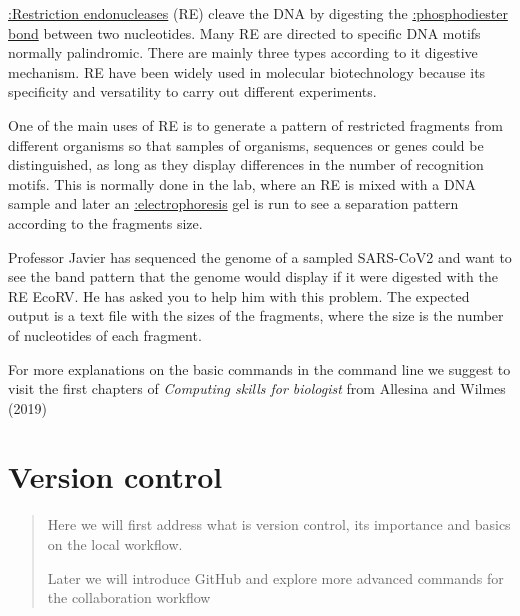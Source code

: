 \documentclass[
  letterpaper,
  DIV=11,
  numbers=noendperiod,
  oneside]{scrreprt}
\begin{document}
\begin{tcolorbox}[enhanced jigsaw, opacityback=0, leftrule=.75mm, breakable, titlerule=0mm, toprule=.15mm, rightrule=.15mm, title=\textcolor{quarto-callout-warning-color}{\faExclamationTriangle}\hspace{0.5em}{Challenge}, colback=white, opacitybacktitle=0.6, toptitle=1mm, bottomtitle=1mm, colframe=quarto-callout-warning-color-frame, colbacktitle=quarto-callout-warning-color!10!white, arc=.35mm, coltitle=black, bottomrule=.15mm, left=2mm]
\href{https://en.wikipedia.org/wiki/Restriction_enzyme}{:Restriction
endonucleases} (RE) cleave the DNA by digesting the
\href{https://en.wikipedia.org/wiki/Phosphodiester_bond}{:phosphodiester
bond} between two nucleotides. Many RE are directed to specific DNA
motifs normally palindromic. There are mainly three types according to
it digestive mechanism. RE have been widely used in molecular
biotechnology because its specificity and versatility to carry out
different experiments.

One of the main uses of RE is to generate a pattern of restricted
fragments from different organisms so that samples of organisms,
sequences or genes could be distinguished, as long as they display
differences in the number of recognition motifs. This is normally done
in the lab, where an RE is mixed with a DNA sample and later an
\href{https://en.wikipedia.org/wiki/Electrophoresis}{:electrophoresis}
gel is run to see a separation pattern according to the fragments size.

Professor Javier has sequenced the genome of a sampled SARS-CoV2 and
want to see the band pattern that the genome would display if it were
digested with the RE EcoRV. He has asked you to help him with this
problem. The expected output is a text file with the sizes of the
fragments, where the size is the number of nucleotides of each fragment.
\end{tcolorbox}

For more explanations on the basic commands in the command line we
suggest to visit the first chapters of \emph{Computing skills for
biologist} from Allesina and Wilmes (2019)

\hypertarget{sec-vcs}{%
\chapter{Version control}\label{sec-vcs}}

\begin{quote}
Here we will first address what is version control, its importance and
basics on the local workflow.

Later we will introduce GitHub and explore more advanced commands for
the collaboration workflow
\end{quote}
\end{document}
